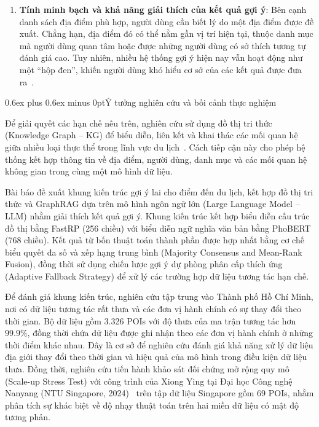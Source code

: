 \documentclass[journal,onecolumn,10pt]{IEEEtran}
\makeatletter
\def\subsection{\@startsection{subsection}{2}{\z@}{1.8ex plus 1.0ex minus 0.3ex}%
{0.6ex plus 0.6ex minus 0pt}{\normalfont\normalsize\bfseries}}
\makeatother
\begin{document}
\begin{enumerate}
    \item \textbf{Tính minh bạch và khả năng giải thích của kết quả gợi ý}: Bên cạnh danh sách địa điểm phù hợp, người dùng cần biết lý do một địa điểm được đề xuất. Chẳng hạn, địa điểm đó có thể nằm gần vị trí hiện tại, thuộc danh mục mà người dùng quan tâm hoặc được những người dùng có sở thích tương tự đánh giá cao. Tuy nhiên, nhiều hệ thống gợi ý hiện nay vẫn hoạt động như một ``hộp đen'', khiến người dùng khó hiểu cơ sở của các kết quả được đưa ra~\cite{r8, r9, r10}.
\end{enumerate}

\subsection{Ý tưởng nghiên cứu và bối cảnh thực nghiệm}

Để giải quyết các hạn chế nêu trên, nghiên cứu sử dụng đồ thị tri thức (Knowledge Graph -- KG) để biểu diễn, liên kết và khai thác các mối quan hệ giữa nhiều loại thực thể trong lĩnh vực du lịch~\cite{r11, r12, r13, r14, r15, r16, r17}. Cách tiếp cận này cho phép hệ thống kết hợp thông tin về địa điểm, người dùng, danh mục và các mối quan hệ không gian trong cùng một mô hình dữ liệu.

Bài báo đề xuất khung kiến trúc gợi ý lai cho điểm đến du lịch, kết hợp đồ thị tri thức và GraphRAG dựa trên mô hình ngôn ngữ lớn (Large Language Model -- LLM) nhằm giải thích kết quả gợi ý. Khung kiến trúc kết hợp biểu diễn cấu trúc đồ thị bằng FastRP (256 chiều) với biểu diễn ngữ nghĩa văn bản bằng PhoBERT (768 chiều). Kết quả từ bốn thuật toán thành phần được hợp nhất bằng cơ chế biểu quyết đa số và xếp hạng trung bình (Majority Consensus and Mean-Rank Fusion), đồng thời sử dụng chiến lược gợi ý dự phòng phân cấp thích ứng (Adaptive Fallback Strategy) để xử lý các trường hợp dữ liệu tương tác hạn chế.

Để đánh giá khung kiến trúc, nghiên cứu tập trung vào Thành phố Hồ Chí Minh, nơi có dữ liệu tương tác rất thưa và các đơn vị hành chính có sự thay đổi theo thời gian. Bộ dữ liệu gồm 3.326 POIs với độ thưa của ma trận tương tác hơn $99.9\%$, đồng thời chứa dữ liệu được ghi nhận theo các đơn vị hành chính ở những thời điểm khác nhau. Đây là cơ sở để nghiên cứu đánh giá khả năng xử lý dữ liệu địa giới thay đổi theo thời gian và hiệu quả của mô hình trong điều kiện dữ liệu thưa. Đồng thời, nghiên cứu tiến hành khảo sát đối chứng mở rộng quy mô (Scale-up Stress Test) với công trình của Xiong Ying tại Đại học Công nghệ Nanyang (NTU Singapore, 2024)~\cite{r18} trên tập dữ liệu Singapore gồm 69 POIs, nhằm phân tích sự khác biệt về độ nhạy thuật toán trên hai miền dữ liệu có mật độ tương phản.
\end{document}
